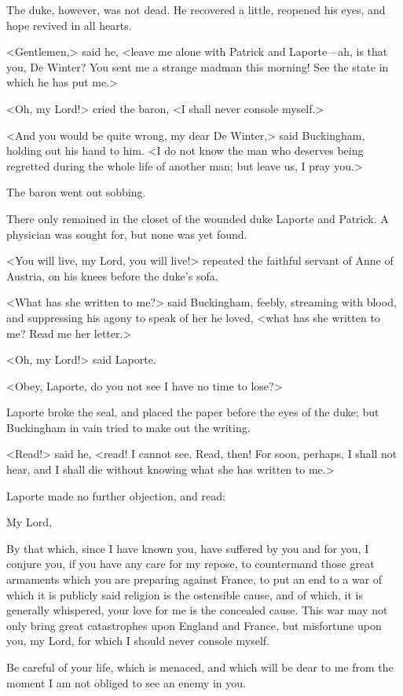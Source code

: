 The duke, however, was not dead. He recovered a little, reopened his eyes, and hope revived in all hearts. 

<Gentlemen,> said he, <leave me alone with Patrick and Laporte---ah, is that you, De Winter? You sent me a strange madman this morning! See the state in which he has put me.> 

<Oh, my Lord!> cried the baron, <I shall never console myself.> 

<And you would be quite wrong, my dear De Winter,> said Buckingham, holding out his hand to him. <I do not know the man who deserves being regretted during the whole life of another man; but leave us, I pray you.> 

The baron went out sobbing. 

There only remained in the closet of the wounded duke Laporte and Patrick. A physician was sought for, but none was yet found. 

<You will live, my Lord, you will live!> repeated the faithful servant of Anne of Austria, on his knees before the duke's sofa. 

<What has she written to me?> said Buckingham, feebly, streaming with blood, and suppressing his agony to speak of her he loved, <what has she written to me? Read me her letter.> 

<Oh, my Lord!> said Laporte. 

<Obey, Laporte, do you not see I have no time to lose?> 

Laporte broke the seal, and placed the paper before the eyes of the duke; but Buckingham in vain tried to make out the writing. 

<Read!> said he, <read! I cannot see. Read, then! For soon, perhaps, I shall not hear, and I shall die without knowing what she has written to me.> 

Laporte made no further objection, and read: 

\begin{mail}{}{My Lord,}
	
By that which, since I have known you, have suffered by you and for you, I conjure you, if you have any care for my repose, to countermand those great armaments which you are preparing against France, to put an end to a war of which it is publicly said religion is the ostensible cause, and of which, it is generally whispered, your love for me is the concealed cause. This war may not only bring great catastrophes upon England and France, but misfortune upon you, my Lord, for which I should never console myself.

Be careful of your life, which is menaced, and which will be dear to me from the moment I am not obliged to see an enemy in you. 

\end{mail}

